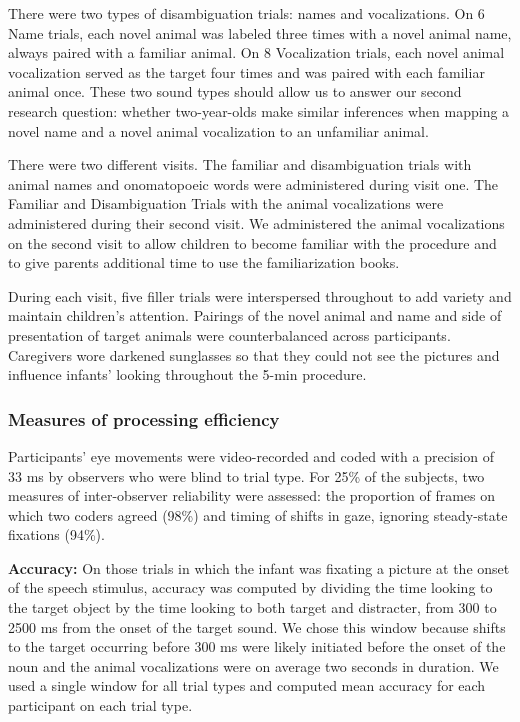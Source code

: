 \documentclass[english,floatsintext,man]{apa6}
\theoremstyle{definition}
\theoremstyle{definition}
\theoremstyle{definition}
\theoremstyle{remark}
\begin{document}
There were two types of disambiguation trials: names and vocalizations.
On 6 Name trials, each novel animal was labeled three times with a novel
animal name, always paired with a familiar animal. On 8 Vocalization
trials, each novel animal vocalization served as the target four times
and was paired with each familiar animal once. These two sound types
should allow us to answer our second research question: whether
two-year-olds make similar inferences when mapping a novel name and a
novel animal vocalization to an unfamiliar animal.

There were two different visits. The familiar and disambiguation trials
with animal names and onomatopoeic words were administered during visit
one. The Familiar and Disambiguation Trials with the animal
vocalizations were administered during their second visit. We
administered the animal vocalizations on the second visit to allow
children to become familiar with the procedure and to give parents
additional time to use the familiarization books.

During each visit, five filler trials were interspersed throughout to
add variety and maintain children's attention. Pairings of the novel
animal and name and side of presentation of target animals were
counterbalanced across participants. Caregivers wore darkened sunglasses
so that they could not see the pictures and influence infants' looking
throughout the 5-min procedure.

\hypertarget{measures-of-processing-efficiency}{%
\subsubsection{Measures of processing
efficiency}\label{measures-of-processing-efficiency}}

Participants' eye movements were video-recorded and coded with a
precision of 33 ms by observers who were blind to trial type. For 25\%
of the subjects, two measures of inter-observer reliability were
assessed: the proportion of frames on which two coders agreed (98\%) and
timing of shifts in gaze, ignoring steady-state fixations (94\%).

\textbf{Accuracy:} On those trials in which the infant was fixating a
picture at the onset of the speech stimulus, accuracy was computed by
dividing the time looking to the target object by the time looking to
both target and distracter, from 300 to 2500 ms from the onset of the
target sound. We chose this window because shifts to the target
occurring before 300 ms were likely initiated before the onset of the
noun and the animal vocalizations were on average two seconds in
duration. We used a single window for all trial types and computed mean
accuracy for each participant on each trial type.
\end{document}

